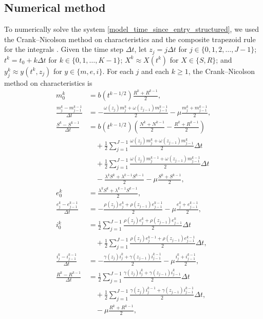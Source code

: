 \documentclass{jpmarticle}
\begin{document}
\subsection{Numerical method}

To numerically solve the system
\eqref{model_time_since_entry_structured}, we used the Crank--Nicolson
method on characteristics and the composite trapezoid rule for the
integrals \autocite{milner_1992}.  Given the time step $\Delta t$,
let $z_j = j \Delta t$
for $j \in \{0, 1, 2, \ldots, J - 1\}$;
$t^k = t_0 + k \Delta t$
for $k \in \{0, 1, \ldots, K - 1\}$;
$X^k \approx X(t^k)$
for $X \in \{S, R\}$;
and $y_j^k \approx y(t^k, z_j)$
for $y \in \{m, e, i\}$.
For each $j$
and each $k \geq 1$, the Crank--Nicolson method on characteristics is
\begin{equation}
  \begin{split}
    m_0^k &=
    b(t^{k - 1 / 2}) \frac{R^k + R^{k - 1}}{2},
    \\
    \frac{m_j^k - m_{j - 1}^{k - 1}}{\Delta t} &=
    - \frac{\omega(z_j) m_j^k + \omega(z_{j - 1}) m_{j - 1}^{k - 1}}{2}
    - \mu \frac{m_j^k + m_{j - 1}^{k - 1}}{2},
    \\
    \frac{S^k - S^{k - 1}}{\Delta t} &=
    b(t^{k - 1 / 2}) \left(\frac{N^k + N^{k - 1}}{2}
      - \frac{R^k + R^{k - 1}}{2}\right)
    \\ & \quad {}
    + \frac{1}{2} \sum_{j = 1}^{J - 1}
    \frac{\omega(z_j) m_j^k + \omega(z_{j - 1}) m_{j - 1}^k}{2}
    \Delta t
    \\ & \quad {}
    + \frac{1}{2} \sum_{j = 1}^{J - 1}
    \frac{\omega(z_j) m_j^{k - 1} + \omega(z_{j - 1}) m_{j - 1}^{k - 1}}{2}
    \Delta t
    \\ & \quad {}
    - \frac{\lambda^k S^k + \lambda^{k - 1} S^{k - 1}}{2}
    - \mu \frac{S^k + S^{k - 1}}{2},
    \\
    e_0^k &=
    \frac{\lambda^k S^k + \lambda^{k - 1} S^{k - 1}}{2},
    \\
    \frac{e_j^k - e_{j - 1}^{k - 1}}{\Delta t} &=
    - \frac{\rho(z_j) e_j^k + \rho(z_{j - 1}) e_{j - 1}^{k - 1}}{2}
    - \mu \frac{e_j^k + e_{j - 1}^{k - 1}}{2},
    \\
    i_0^k &=
    \frac{1}{2} \sum_{j = 1}^{J - 1}
    \frac{\rho(z_j) e_j^k + \rho(z_{j - 1}) e_{j - 1}^k}{2}
    \Delta t
    \\ & \quad {}
    + \frac{1}{2} \sum_{j = 1}^{J - 1}
    \frac{\rho(z_j) e_j^{k - 1} + \rho(z_{j - 1}) e_{j - 1}^{k - 1}}{2}
    \Delta t,
    \\
    \frac{i_j^k - i_{j - 1}^{k - 1}}{\Delta t} &=
    - \frac{\gamma(z_j) i_j^k + \gamma(z_{j - 1}) i_{j - 1}^{k - 1}}{2}
    - \mu \frac{i_j^k + i_{j - 1}^{k - 1}}{2},
    \\
    \frac{R^k - R^{k - 1}}{\Delta t} &=
    \frac{1}{2} \sum_{j = 1}^{J - 1}
    \frac{\gamma(z_j) i_j^k + \gamma(z_{j - 1}) i_{j - 1}^k}{2}
    \Delta t
    \\ & \quad {}
    + \frac{1}{2} \sum_{j = 1}^{J - 1}
    \frac{\gamma(z_j) i_j^{k - 1} + \gamma(z_{j - 1}) i_{j - 1}^{k - 1}}{2}
    \Delta t,
    \\ & \quad {}
    - \mu \frac{R^k + R^{k - 1}}{2},
  \end{split}
\end{equation}
\end{document}
